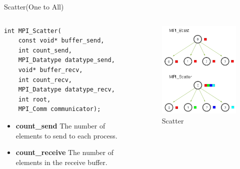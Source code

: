 \begin{frame}[fragile]{Scatter(One to All)}
    \begin{columns}
    
\begin{column}{.5\textwidth}
\begin{verbatim}
int MPI_Scatter(
    const void* buffer_send,
    int count_send,
    MPI_Datatype datatype_send,
    void* buffer_recv,
    int count_recv,
    MPI_Datatype datatype_recv,
    int root,
    MPI_Comm communicator);
\end{verbatim}

{\scriptsize
\begin{itemize}
    \item \textbf{count\_send}
    The number of elements to send to each process.

    \item \textbf{count\_receive}
    The number of elements in the receive buffer.
    
\end{itemize}
}
\end{column}

\begin{column}{.5\textwidth}
\begin{figure}
    \centering
    \includegraphics[width=0.8\linewidth]{day8_am/img/mpi/scatter.png}
    \caption{Scatter}
    \label{fig:scatter}
\end{figure}
\end{column}
\end{columns}
\end{frame}

